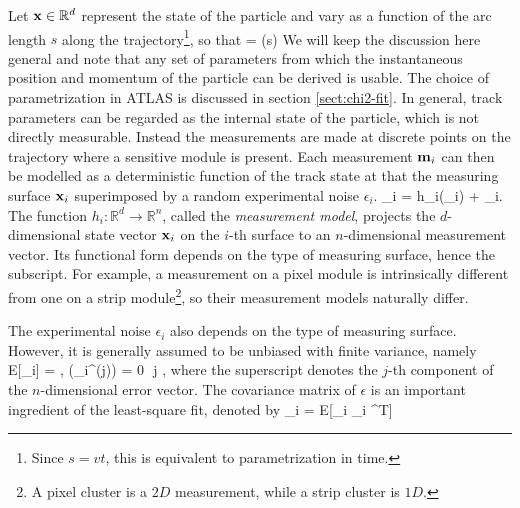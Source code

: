 Let $\mathbf{x}\in \mathbb{R}^d$ represent the state of the particle and vary as a function of the arc length $s$ along the trajectory\footnote{Since $s=vt$, this is equivalent to parametrization in time.}, so that 
\beq
\label{eq:track-fit:1}
\bfx = \bfx(s)
\eeq
We will keep the discussion here general and note that any set of parameters from which the instantaneous position and momentum of the particle can be derived is usable. 
The choice of parametrization in ATLAS is discussed in section \ref{sect:chi2-fit}.
In general, track parameters can be regarded as the internal state of the particle, which is not directly measurable.
Instead the measurements are made at discrete points on the trajectory where a sensitive module is present.
Each measurement $\mathbf{m}_i$ can then be modelled as a deterministic function of the track state at that the measuring surface $\mathbf{x}_i$ superimposed by a random experimental noise $\epsilon_i$.
\beq
\label{eq:track-fit:2}
\bfm_i = h_i(\bfx_i) + \epsilon_i.
\eeq
The function $h_i:\mathbb{R}^d \rightarrow \mathbb{R}^n$, called the \textit{measurement model}, projects the $d$-dimensional state vector $\mathbf{x}_i$ on the $i$-th surface to an $n$-dimensional measurement vector. 
Its functional form depends on the type of measuring surface, hence the subscript.
For example, a measurement on a pixel module is intrinsically different from one on a strip module\footnote{A pixel cluster is a $2D$ measurement, while a strip cluster is $1D$.}, so their measurement models naturally differ. 

The experimental noise $\epsilon_i$ also depends on the type of measuring surface. 
However, it is generally assumed to be unbiased with finite variance, namely
\beq
\label{eq:track-fit:3}
E[\epsilon_i] = , \quad \sigma(\epsilon_i^{(j)}) = 0\,\forall \, j \in [n],
\eeq
where the superscript denotes the $j$-th component of the $n$-dimensional error vector.
The covariance matrix of $\epsilon$ is an important ingredient of the least-square fit, denoted by
\beq
\label{eq:track-fit:4}
_i = E[\epsilon_i \epsilon_i ^T]
\eeq

